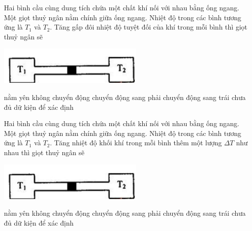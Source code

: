 \begin{ex}
	Hai bình cầu cùng dung tích chứa một chất khí nối với nhau bằng ống ngang. Một giọt thuỷ ngân nằm chính giữa ống ngang. Nhiệt độ trong các bình tương ứng là $T_1$ và $T_2$. Tăng gấp đôi nhiệt độ tuyệt đối của khí trong mỗi bình thì giọt thuỷ ngân sẽ
	\begin{center}
		\includegraphics[width=0.35\linewidth]{figs/VN12-Y24-PH-SYL-012P-4}
	\end{center}
	
	\choice
	{\True nằm yên không chuyển động}
	{chuyển động sang phải}
	{chuyển động sang trái}
	{chưa đủ dữ kiện để xác định}
\end{ex}
\begin{ex}
	Hai bình cầu cùng dung tích chứa một chất khí nối với nhau bằng ống ngang. Một giọt thuỷ ngân nằm chính giữa ống ngang. Nhiệt độ trong các bình tương ứng là $T_1$ và $T_2$. Tăng nhiệt độ khối khí trong mỗi bình thêm một lượng $\Delta T$ như nhau thì giọt thuỷ ngân sẽ 
	\begin{center}
		\includegraphics[width=0.35\linewidth]{figs/VN12-Y24-PH-SYL-012P-4}
	\end{center}
	
	\choice
	{nằm yên không chuyển động}
	{chuyển động sang phải}
	{chuyển động sang trái}
	{\True chưa đủ dữ kiện để xác định}
\end{ex}
